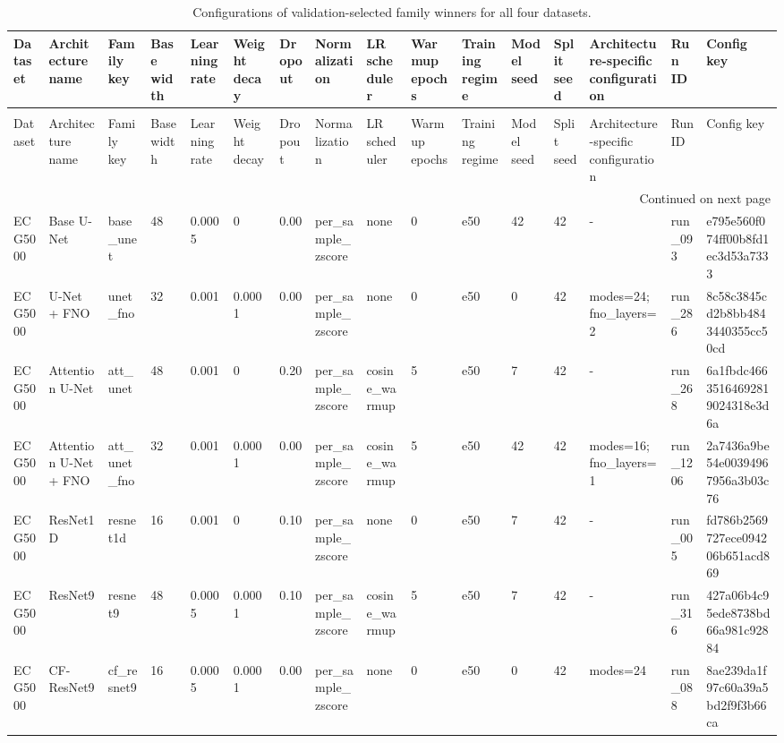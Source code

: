 \begin{longtable}{llllllllllllllll}
\caption{Configurations of validation-selected family winners for all four datasets.} \label{tab:all_datasets_best_model_configurations} \\
\toprule
Dataset & Architecture name & Family key & Base width & Learning rate & Weight decay & Dropout & Normalization & LR scheduler & Warmup epochs & Training regime & Model seed & Split seed & Architecture-specific configuration & Run ID & Config key \\
\midrule
\endfirsthead
\caption[]{Configurations of validation-selected family winners for all four datasets.} \\
\toprule
Dataset & Architecture name & Family key & Base width & Learning rate & Weight decay & Dropout & Normalization & LR scheduler & Warmup epochs & Training regime & Model seed & Split seed & Architecture-specific configuration & Run ID & Config key \\
\midrule
\endhead
\midrule
\multicolumn{16}{r}{Continued on next page} \\
\midrule
\endfoot
\bottomrule
\endlastfoot
ECG5000 & Base U-Net & base\_unet & 48 & 0.0005 & 0 & 0.00 & per\_sample\_zscore & none & 0 & e50 & 42 & 42 & - & run\_093 & e795e560f074ff00b8fd1ec3d53a7333 \\
ECG5000 & U-Net + FNO & unet\_fno & 32 & 0.001 & 0.0001 & 0.00 & per\_sample\_zscore & none & 0 & e50 & 0 & 42 & modes=24; fno\_layers=2 & run\_286 & 8c58c3845cd2b8bb4843440355cc50cd \\
ECG5000 & Attention U-Net & att\_unet & 48 & 0.001 & 0 & 0.20 & per\_sample\_zscore & cosine\_warmup & 5 & e50 & 7 & 42 & - & run\_268 & 6a1fbdc46635164692819024318e3d6a \\
ECG5000 & Attention U-Net + FNO & att\_unet\_fno & 32 & 0.001 & 0.0001 & 0.00 & per\_sample\_zscore & cosine\_warmup & 5 & e50 & 42 & 42 & modes=16; fno\_layers=1 & run\_1206 & 2a7436a9be54e00394967956a3b03c76 \\
ECG5000 & ResNet1D & resnet1d & 16 & 0.001 & 0 & 0.10 & per\_sample\_zscore & none & 0 & e50 & 7 & 42 & - & run\_005 & fd786b2569727ece094206b651acd869 \\
ECG5000 & ResNet9 & resnet9 & 48 & 0.0005 & 0.0001 & 0.10 & per\_sample\_zscore & cosine\_warmup & 5 & e50 & 7 & 42 & - & run\_316 & 427a06b4c95ede8738bd66a981c92884 \\
ECG5000 & CF-ResNet9 & cf\_resnet9 & 16 & 0.0005 & 0.0001 & 0.00 & per\_sample\_zscore & none & 0 & e50 & 0 & 42 & modes=24 & run\_088 & 8ae239da1f97c60a39a5bd2f9f3b66ca \\

\end{longtable}
